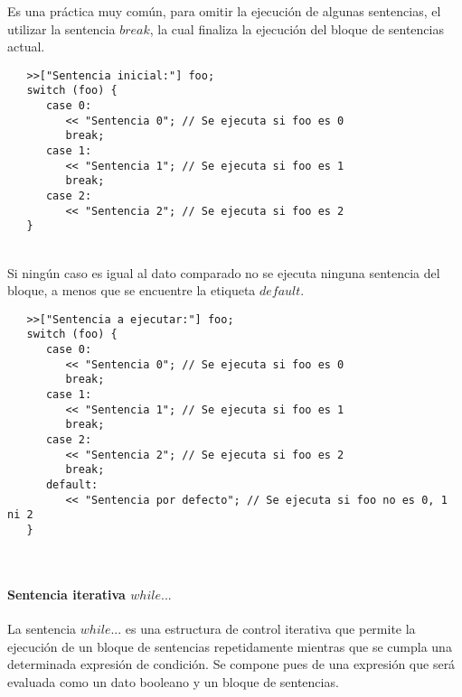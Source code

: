 Es una práctica muy común, para omitir la ejecución de algunas sentencias, el utilizar la sentencia $break$, la cual finaliza la 
ejecución del bloque de sentencias actual. \\ 

\begin{lstlisting}
   >>["Sentencia inicial:"] foo;
   switch (foo) {
      case 0: 
         << "Sentencia 0"; // Se ejecuta si foo es 0
         break;
      case 1:
         << "Sentencia 1"; // Se ejecuta si foo es 1
         break;
      case 2:
         << "Sentencia 2"; // Se ejecuta si foo es 2
   }
\end{lstlisting}
\hfill\\

Si ningún caso es igual al dato comparado no se ejecuta ninguna sentencia del bloque, a menos que se encuentre 
la etiqueta $default$. \\

\begin{lstlisting}
   >>["Sentencia a ejecutar:"] foo;
   switch (foo) {
      case 0: 
         << "Sentencia 0"; // Se ejecuta si foo es 0
         break;
      case 1:
         << "Sentencia 1"; // Se ejecuta si foo es 1
         break;
      case 2:
         << "Sentencia 2"; // Se ejecuta si foo es 2
         break;
      default:
         << "Sentencia por defecto"; // Se ejecuta si foo no es 0, 1 ni 2
   }
\end{lstlisting}
\hfill\\


\paragraph{Sentencia iterativa $while...$} \label{sec:stmt_while}

La sentencia $while...$ es una estructura de control iterativa que permite la ejecución de un bloque de 
sentencias repetidamente mientras que se cumpla una determinada expresión de condición. Se compone pues de una expresión que será evaluada como 
un dato booleano y un bloque de sentencias. \\


